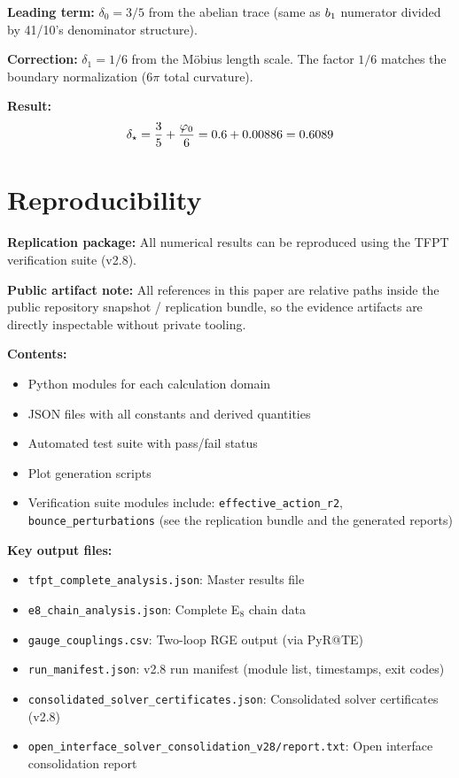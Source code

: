 \textbf{Leading term:} $\delta_0 = 3/5$ from the abelian trace (same as $b_1$ numerator 
divided by 41/10's denominator structure).

\textbf{Correction:} $\delta_1 = 1/6$ from the M\"obius length scale. The factor $1/6$ 
matches the boundary normalization ($6\pi$ total curvature).

\textbf{Result:}
\begin{equation}
    \delta_\star = \frac{3}{5} + \frac{\varphi_0}{6} = 0.6 + 0.00886 = 0.6089
\end{equation}

\section{Reproducibility}
\label{app:repro}

\textbf{Replication package:} All numerical results can be reproduced using the 
TFPT verification suite (v2.8).

\textbf{Public artifact note:} All  references in this paper are
relative paths inside the public repository snapshot / replication bundle, so the
evidence artifacts are directly inspectable without private tooling.

\textbf{Contents:}
\begin{itemize}[leftmargin=1.5em, topsep=2pt, itemsep=1pt]
    \item Python modules for each calculation domain
    \item JSON files with all constants and derived quantities
    \item Automated test suite with pass/fail status
    \item Plot generation scripts
    \item Verification suite modules include: \texttt{effective\_action\_r2}, \texttt{bounce\_perturbations} (see the replication bundle and the generated reports)
\end{itemize}

\textbf{Key output files:}
\begin{itemize}[leftmargin=1.5em, topsep=2pt, itemsep=1pt]
    \item \texttt{tfpt\_complete\_analysis.json}: Master results file
    \item \texttt{e8\_chain\_analysis.json}: Complete E$_8$ chain data
    \item \texttt{gauge\_couplings.csv}: Two-loop RGE output (via PyR@TE)
    \item \texttt{run\_manifest.json}: v2.8 run manifest (module list, timestamps, exit codes)
    \item \texttt{consolidated\_solver\_certificates.json}: Consolidated solver certificates (v2.8)
    \item \texttt{open\_interface\_solver\_consolidation\_v28/report.txt}: Open interface consolidation report
\end{itemize}

